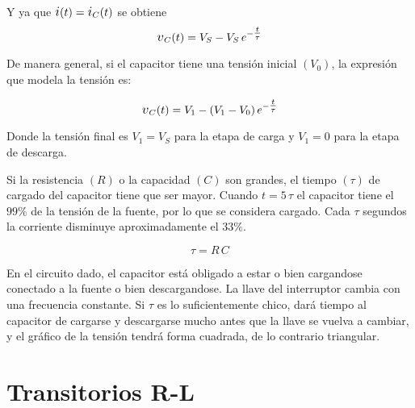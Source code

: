 Y ya que $\current(t) = \current_C(t)$ se obtiene
\begin{equation*}
    \voltage_C(t) = V_S - V_S \, e^{-\tfrac{t}{\tau}}
\end{equation*}

\begin{center}
    \def\svgwidth{0.8\linewidth}
    
\end{center}

De manera general, si el capacitor tiene una tensión inicial $(V_0)$, la expresión que modela la tensión es:

\begin{equation*}
    \voltage_C(t) = V_1 - \inParentheses{V_1 - V_0} e^{-\tfrac{t}{\tau}}
\end{equation*}

Donde la tensión final es $V_1 = V_S$ para la etapa de carga y $V_1 = 0$ para la etapa de descarga.

Si la resistencia $(R)$ o la capacidad $(C)$ son grandes, el tiempo $(\tau)$ de cargado del capacitor tiene que ser mayor.
Cuando $t = 5 \, \tau$ el capacitor tiene el $99\%$ de la tensión de la fuente, por lo que se considera cargado.
Cada $\tau$ segundos la corriente disminuye aproximadamente el $33\%$.

\begin{mdframed}[style=DefinitionFrame]
    \begin{defn}
    \end{defn}
    \begin{equation*}
        \tau = R \, C
    \end{equation*}
\end{mdframed}

En el circuito dado, el capacitor está obligado a estar o bien cargandose conectado a la fuente o bien descargandose.
La llave del interruptor cambia con una frecuencia constante.
Si $\tau$ es lo suficientemente chico, dará tiempo al capacitor de cargarse y descargarse mucho antes que la llave se vuelva a cambiar, y el gráfico de la tensión tendrá forma cuadrada, de lo contrario triangular.

\begin{center}
    \def\svgwidth{\linewidth}
    
\end{center}


\section{Transitorios R-L}

